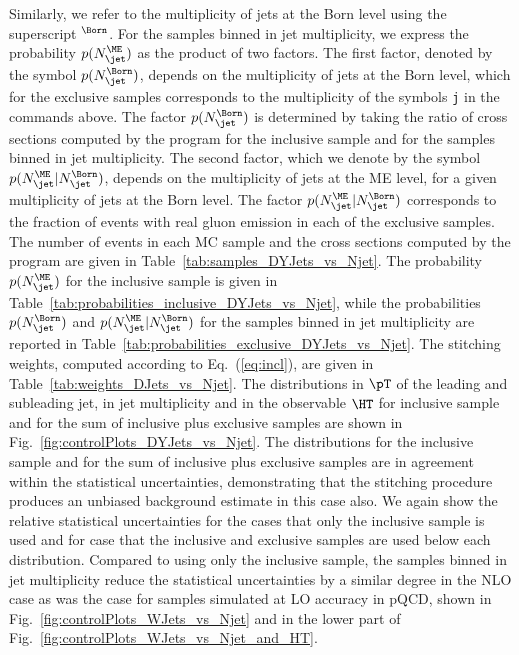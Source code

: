 Similarly, we refer to the multiplicity of jets at the Born level using the superscript $^{\Born}$.
For the samples binned in jet multiplicity,
we express the probability $p(N_{\jet}^{\ME})$ as the product of two factors.
The first factor, denoted by the symbol $p(N_{\jet}^{\Born})$, depends on the multiplicity of jets at the Born level, 
which for the exclusive samples corresponds to the multiplicity of the symbols \texttt{j} in the \MGvATNLO commands above.
The factor $p(N_{\jet}^{\Born})$ is determined by taking the ratio of cross sections computed by the program \MGvATNLO 
for the inclusive sample and for the samples binned in jet multiplicity.
The second factor, which we denote by the symbol $p(N_{\jet}^{\ME} \vert N_{\jet}^{\Born})$, depends on the multiplicity of jets at the ME level,
for a given multiplicity of jets at the Born level.
The factor $p(N_{\jet}^{\ME} \vert N_{\jet}^{\Born})$ corresponds to the fraction of events with real gluon emission in each of the exclusive samples.
The number of events in each MC sample and the cross sections computed by the program \MGvATNLO are given in Table~\ref{tab:samples_DYJets_vs_Njet}.
The probability $p(N_{\jet}^{\ME})$ for the inclusive sample is given in Table~\ref{tab:probabilities_inclusive_DYJets_vs_Njet},
while the probabilities $p(N_{\jet}^{\Born})$ and $p(N_{\jet}^{\ME} \vert N_{\jet}^{\Born})$ for the samples binned in jet multiplicity are reported in Table~\ref{tab:probabilities_exclusive_DYJets_vs_Njet}.
The stitching weights, computed according to Eq.~(\ref{eq:incl}), are given in Table~\ref{tab:weights_DJets_vs_Njet}.
The distributions in $\pT$ of the leading and subleading jet,
in jet multiplicity and in the observable $\HT$ 
for inclusive sample and for the sum of inclusive plus exclusive samples are shown in Fig.~\ref{fig:controlPlots_DYJets_vs_Njet}.
The distributions for the inclusive sample and for the sum of inclusive plus exclusive samples are in agreement within the statistical uncertainties,
demonstrating that the stitching procedure produces an unbiased background estimate in this case also.
We again show the relative statistical uncertainties for the cases that only the inclusive sample is used
and for case that the inclusive and exclusive samples are used below each distribution.
Compared to using only the inclusive sample,
the samples binned in jet multiplicity reduce the statistical uncertainties by a similar degree in the NLO case
as was the case for samples simulated at LO accuracy in pQCD, 
shown in Fig.~\ref{fig:controlPlots_WJets_vs_Njet} and in the lower part of Fig.~\ref{fig:controlPlots_WJets_vs_Njet_and_HT}.

